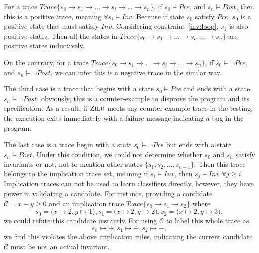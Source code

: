 For a trace $Trace\{s_0 \to s_1 \to ... \to s_i \to ... \to s_n\}$, 
if $s_0 \models Pre$, and $s_n \models Post$,
then this is a positive trace, meaning $\forall s_i \models Inv$.
Because if state $s_0$ satisfy $Pre$,
$s_0$ is a positive state that must satisfy $Inv$. %
Considering constraint~\ref{inv:loop}, $s_1$ is also positive states.
Then all the states in $Trace\{s_0 \to s_1 \to ...\to s_i, ... \to s_n\}$ are positive states inductively. 

On the contrary, for a trace $Trace\{s_0 \to s_1 \to ...\to s_i \to ... \to s_n\}$, 
if $s_0 \models \neg Pre$, and $s_n \models \neg Post$,
we can infer this is a negative trace in the similar way. 


The third case is a trace that begins with a state $s_0 \models Pre$ and ends with a state $s_n \models \neg Post$,
obviously, this is a counter-example to disprove the program and its specification.
As a result, if $\textsc{Zilu}$ meets any counter-example trace in the testing, 
the execution exits immediately with a failure message indicating a bug in the program. 

The last case is a trace begin with a state $s_0 \models \neg Pre$ but ends with a state $s_n \models Post$.
Under this condition, we could not determine whether $s_0$ and $s_n$ satisfy invariants or not,
not to mention other states $\{s_1, s_2, ..., s_{n-1}\}$.
Then this trace belongs to the implication trace set, meaning if $s_i \models Inv$, then $s_j \models Inv$ $\forall j \ge i$.
Implication traces can not be used to learn classifiers directly, 
however, they have power in validating a candidate.
For instance, providing a candidate $\mathcal{C} = x - y \ge 0$ and an implication trace 
$Trace\{s_0 \to s_1 \to s_2\}$ where 
$$s_0 = \big(x \mapsto 2, y \mapsto 1\big),  s_1 = \big(x \mapsto 2, y \mapsto 2\big),  s_2 = \big(x \mapsto 2, y \mapsto 3\big),$$
we could refute this candidate instantly.
For using $\mathcal{C}$ to label this whole trace as $$s_0 \mapsto +,  s_1 \mapsto +,  s_2 \mapsto -,$$ 
we find this violates the above implication rules,
indicating the current candidate $\mathcal{C}$ must be not an actual invariant.



